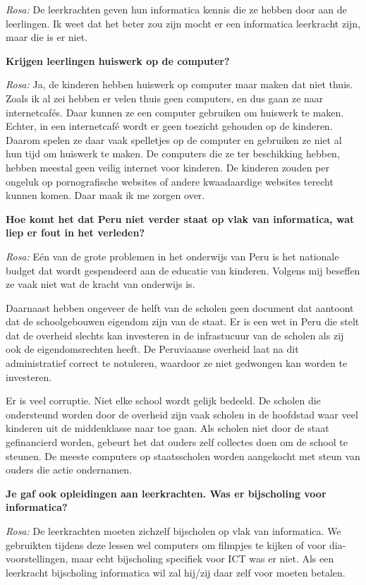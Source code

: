 \textit{Rosa:} De leerkrachten geven hun informatica kennis die ze hebben door aan de leerlingen. Ik weet dat het beter zou zijn mocht er een informatica leerkracht zijn, maar die is er niet.

\textbf{Krijgen leerlingen huiswerk op de computer?}

\textit{Rosa:} Ja, de kinderen hebben huiswerk op computer maar maken dat niet thuis. Zoals ik al zei hebben er velen thuis geen computers, en dus gaan ze naar internetcafés. Daar kunnen ze een computer gebruiken om huiswerk te maken. Echter, in een internetcafé wordt er geen toezicht gehouden op de kinderen. Daarom spelen ze daar vaak spelletjes op de computer en gebruiken ze niet al hun tijd om huiswerk te maken. De computers die ze ter beschikking hebben, hebben meestal geen veilig internet voor kinderen. De kinderen zouden per ongeluk op pornografische websites of andere kwaadaardige websites terecht kunnen komen. Daar maak ik me zorgen over.

\textbf{Hoe komt het dat Peru niet verder staat op vlak van informatica, wat liep er fout in het verleden?}

\textit{Rosa:} Eén van de grote problemen in het onderwijs van Peru is het nationale budget dat wordt gespendeerd aan de educatie van kinderen. Volgens mij beseffen ze vaak niet wat de kracht van onderwijs is. 

Daarnaast hebben ongeveer de helft van de scholen geen document dat aantoont dat de schoolgebouwen eigendom zijn van de staat. Er is een wet in Peru die stelt dat de overheid slechts kan investeren in de infrastucuur van de scholen als zij ook de eigendomsrechten heeft. De Peruviaanse overheid laat na dit administratief correct te notuleren, waardoor ze niet gedwongen kan worden te investeren.

Er is veel corruptie. Niet elke school wordt gelijk bedeeld. De scholen die ondersteund worden door de overheid zijn vaak scholen in de hoofdstad waar veel kinderen uit de middenklasse naar toe gaan. Als scholen niet door de staat gefinancierd worden, gebeurt het dat ouders zelf collectes doen om de school te steunen. De meeste computers op staatsscholen worden aangekocht met steun van ouders die actie ondernamen. 

\textbf{Je gaf ook opleidingen aan leerkrachten. Was er bijscholing voor informatica?}

\textit{Rosa:} De leerkrachten moeten zichzelf bijscholen op vlak van informatica. We gebruikten tijdens deze lessen wel computers om filmpjes te kijken of voor  dia-voorstellingen, maar echt bijscholing specifiek voor ICT was er niet. Als een leerkracht bijscholing informatica wil zal hij/zij daar zelf voor moeten betalen.

